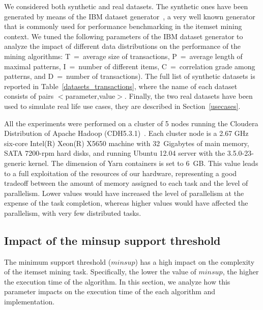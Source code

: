 We considered both synthetic and real datasets.
The synthetic ones have been
generated by means of the IBM dataset generator~\cite{Quest}, a very well
known generator that is commonly used for performance benchmarking in the
itemset mining context.
We tuned the following parameters of the IBM dataset generator to analyze
the impact of different data distributions on the performance of the
mining algorithms:
T~=~average size of transactions,
P~=~average length of maximal patterns,
I~=~number of different items,
C~=~correlation grade among patterns, and
D~=~number of transactions).
The full list of synthetic datasets is reported in Table~\ref{datasets_transactions},
where the name of each dataset consists of pairs $<$parameter,value$>$.
Finally, the two real datasets have been used to simulate real life use cases,
they are described in Section~\ref{usecases}.

All the experiments were performed on a cluster of 5 nodes running the Cloudera
Distribution of Apache Hadoop (CDH5.3.1)~\cite{cloudera}.
Each cluster node is a 2.67 GHz six-core Intel(R) Xeon(R) X5650 machine
with 32~Gigabytes of main memory, SATA 7200-rpm hard disks, and
running Ubuntu 12.04 server with the 3.5.0-23-generic kernel.
The dimension of Yarn containers is set to 6~GB. This value leads to a
full exploitation of the resources of our hardware, representing a good
tradeoff between the amount of memory assigned to each task and the
level of parallelism.
Lower values would have increased the level of parallelism at the expense
of the task completion, whereas higher values would have affected
the parallelism, with very few distributed tasks.



\subsection{Impact of the minsup support threshold}
\label{minsup_exp}
The minimum support threshold ($minsup$) has a high impact on the complexity of
the itemset mining task. Specifically, the lower the value of $minsup$, the
higher the execution time of the algorithm. In this section, we analyze how this
parameter impacts on the execution time of the each algorithm and implementation.


